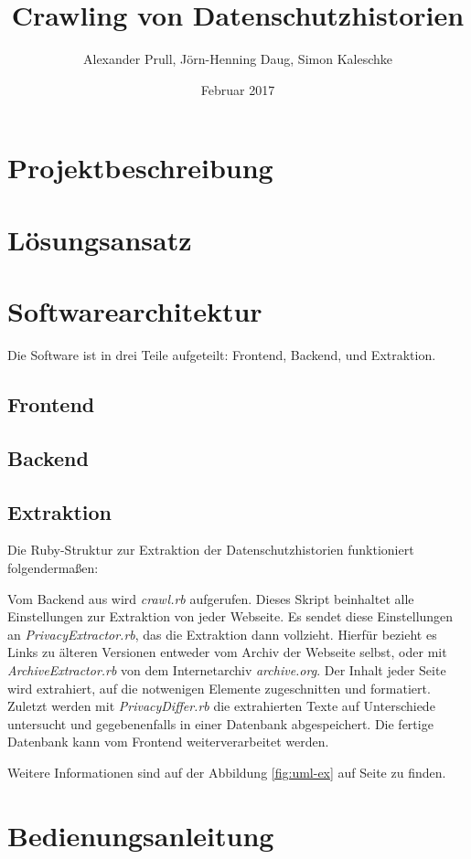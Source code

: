 \documentclass{article}
\title{Crawling von Datenschutzhistorien}
\author{Alexander Prull, Jörn-Henning Daug, Simon Kaleschke}
\date{Februar 2017}
\begin{document}
	
	\maketitle
	
	\section{Projektbeschreibung}
	
	\section{Lösungsansatz}
	
	\section{Softwarearchitektur}
	Die Software ist in drei Teile aufgeteilt: Frontend, Backend, und Extraktion.
	
	\subsection{Frontend}
	\subsection{Backend}
	\subsection{Extraktion}
	Die Ruby-Struktur zur Extraktion der Datenschutzhistorien funktioniert folgendermaßen:
	
	Vom Backend aus wird \textit{crawl.rb} aufgerufen. Dieses Skript beinhaltet alle Einstellungen zur Extraktion von jeder Webseite. Es sendet diese Einstellungen an \textit{PrivacyExtractor.rb}, das die Extraktion dann vollzieht. Hierfür bezieht es Links zu älteren Versionen entweder vom Archiv der Webseite selbst, oder mit \textit{ArchiveExtractor.rb} von dem Internetarchiv \textit{archive.org}. Der Inhalt jeder Seite wird extrahiert, auf die notwenigen Elemente zugeschnitten und formatiert. Zuletzt werden mit \textit{PrivacyDiffer.rb} die extrahierten Texte auf Unterschiede untersucht und gegebenenfalls in einer Datenbank abgespeichert. Die fertige Datenbank kann vom Frontend weiterverarbeitet werden.
	
	Weitere Informationen sind auf der Abbildung \ref{fig:uml-ex} auf Seite \pageref{fig:uml-ex} zu finden.
	
	\section{Bedienungsanleitung}
\end{document}
